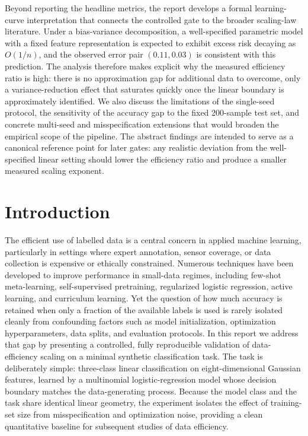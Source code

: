 \documentclass[10pt]{article}
\begin{document}
Beyond reporting the headline metrics, the report develops a formal learning-curve interpretation that connects the controlled gate to the broader scaling-law literature. Under a bias-variance decomposition, a well-specified parametric model with a fixed feature representation is expected to exhibit excess risk decaying as \(O(1/n)\), and the observed error pair \((0.11, 0.03)\) is consistent with this prediction. The analysis therefore makes explicit why the measured efficiency ratio is high: there is no approximation gap for additional data to overcome, only a variance-reduction effect that saturates quickly once the linear boundary is approximately identified. We also discuss the limitations of the single-seed protocol, the sensitivity of the accuracy gap to the fixed 200-sample test set, and concrete multi-seed and misspecification extensions that would broaden the empirical scope of the pipeline. The abstract findings are intended to serve as a canonical reference point for later gates: any realistic deviation from the well-specified linear setting should lower the efficiency ratio and produce a smaller measured scaling exponent.

\section{Introduction}
The efficient use of labelled data is a central concern in applied machine learning, particularly in settings where expert annotation, sensor coverage, or data collection is expensive or ethically constrained. Numerous techniques have been developed to improve performance in small-data regimes, including few-shot meta-learning, self-supervised pretraining, regularized logistic regression, active learning, and curriculum learning. Yet the question of how much accuracy is retained when only a fraction of the available labels is used is rarely isolated cleanly from confounding factors such as model initialization, optimization hyperparameters, data splits, and evaluation protocols. In this report we address that gap by presenting a controlled, fully reproducible validation of data-efficiency scaling on a minimal synthetic classification task. The task is deliberately simple: three-class linear classification on eight-dimensional Gaussian features, learned by a multinomial logistic-regression model whose decision boundary matches the data-generating process. Because the model class and the task share identical linear geometry, the experiment isolates the effect of training-set size from misspecification and optimization noise, providing a clean quantitative baseline for subsequent studies of data efficiency.
\end{document}
